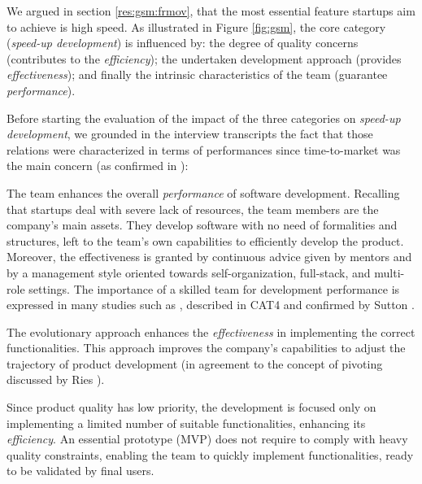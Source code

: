 \documentclass[10pt,journal,letterpaper,compsoc]{IEEEtran}
\begin{document}
We argued in section \ref{res:gsm:frmov}, that the most essential feature startups aim to achieve is high speed. As illustrated in Figure \ref{fig:gsm}, the core category (\textit{speed-up development}) is influenced by: the degree of quality concerns (contributes to the \textit{efficiency}); the undertaken development approach (provides \textit{effectiveness}); and finally the intrinsic characteristics of the team (guarantee \textit{performance}). 

Before starting the evaluation of the impact of the three categories on \textit{speed-up development}, we grounded in the interview transcripts the fact that those relations were characterized in terms of performances since time-to-market was the main concern (as confirmed in \cite{SMS}):

\begin{compactitem}

\item The team enhances the overall \textit{performance} of software development. Recalling that startups deal with severe lack of resources, the team members are the company's main assets. They develop software with no need of formalities and structures, left to the team's own capabilities to efficiently develop the product. Moreover, the effectiveness is granted by continuous advice given by mentors and by a management style oriented towards self-organization, full-stack, and multi-role settings. The importance of a skilled team for development performance is expressed in many studies such as \cite{surviving-os-cockburn, Highsmith2000}, described in CAT4 and confirmed by Sutton \cite{Sutton2000}.
\item The evolutionary approach enhances the \textit{effectiveness} in implementing the correct functionalities. This approach improves the company's capabilities to adjust the trajectory of product development (in agreement to the concept of pivoting discussed by Ries \cite{Ries2011}).
\item Since product quality has low priority, the development is focused only on implementing a limited number of suitable functionalities, enhancing its \textit{efficiency}. An essential prototype (MVP) does not require to comply with heavy quality constraints, enabling the team to quickly implement functionalities, ready to be validated by final users.
\end{compactitem}
\end{document}
